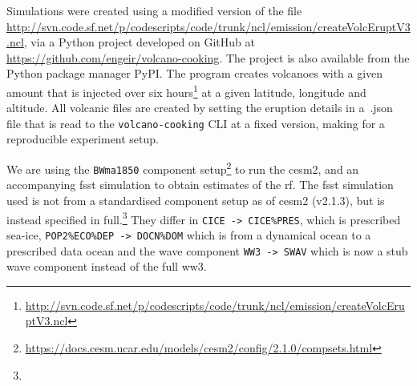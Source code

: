 \documentclass{ametsocV6.1}
\begin{document}



%



\appendix

\appendix[A]


Simulations were created using a modified version of the file
\url{http://svn.code.sf.net/p/codescripts/code/trunk/ncl/emission/createVolcEruptV3.ncl},
via a Python project developed on GitHub at
\url{https://github.com/engeir/volcano-cooking}. The project is also available from the
Python package manager PyPI\@. The program creates volcanoes with a given 
amount that is injected over six
hours\footnote{\url{http://svn.code.sf.net/p/codescripts/code/trunk/ncl/emission/createVolcEruptV3.ncl}}
at a given latitude, longitude and altitude. All volcanic  files are created by
setting the eruption details in a~.json file that is read to the
\texttt{volcano-cooking} CLI at a fixed version, making for a reproducible experiment
setup.

We are using the \texttt{BWma1850} component
setup\footnote{\url{https://docs.cesm.ucar.edu/models/cesm2/config/2.1.0/compsets.html}}
to run the \gls{cesm2}, and an accompanying \gls{fsst} simulation to obtain estimates of
the \gls{rf}. The \gls{fsst} simulation used is not from a standardised component setup
as of \gls{cesm2} (v2.1.3), but is instead specified in full.\footnote{\fssturl} They
differ in \texttt{CICE -> CICE\%PRES}, which is prescribed sea-ice,
\texttt{POP2\%ECO\%DEP -> DOCN\%DOM} which is from a dynamical ocean to a prescribed
data ocean and the wave component \texttt{WW3 -> SWAV} which is now a stub wave
component instead of the full \gls{ww3}.
\end{document}
